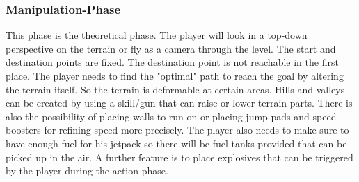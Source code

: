 \documentclass[12pt, letterpaper]{scrartcl}
\begin{document}
	\subsubsection{Manipulation-Phase}
	This phase is the theoretical phase. The player will look in a top-down perspective on the terrain or fly as a camera through the level. The start and destination points are fixed. The destination point is not reachable in the first place. 
	The player needs to find the "optimal" path to reach the goal by altering the terrain itself. So the terrain is deformable at certain areas. Hills and valleys can be created by using a skill/gun that can raise or lower terrain parts. There is also the possibility of placing walls to run on or placing jump-pads and speed-boosters for refining speed more precisely. The player also needs to make sure to have enough fuel for his jetpack so there will be fuel tanks provided that can be picked up in the air. A further feature is to place explosives that can be triggered by the player during the action phase.
\end{document}
